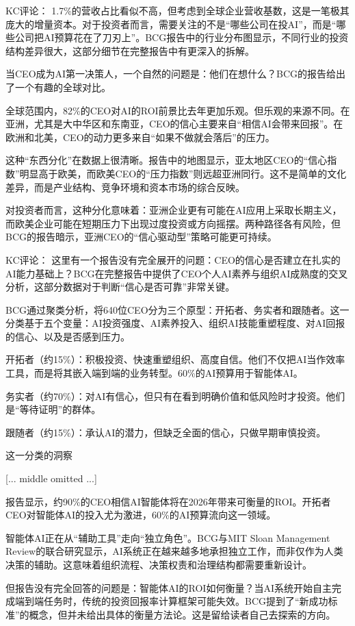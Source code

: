 \documentclass[11pt]{ctexart}
\begin{document}
KC评论： 1.7\%的营收占比看似不高，但考虑到全球企业营收基数，这是一笔极其庞大的增量资本。对于投资者而言，需要关注的不是“哪些公司在投AI”，而是“哪些公司把AI预算花在了刀刃上”。BCG报告中的行业分布图显示，不同行业的投资结构差异很大，这部分细节在完整报告中有更深入的拆解。

当CEO成为AI第一决策人，一个自然的问题是：他们在想什么？BCG的报告给出了一个有趣的全球对比。

全球范围内，82\%的CEO对AI的ROI前景比去年更加乐观。但乐观的来源不同。在亚洲，尤其是大中华区和东南亚，CEO的信心主要来自“相信AI会带来回报”。在欧洲和北美，CEO的动力更多来自“如果不做就会落后”的压力。

这种“东西分化”在数据上很清晰。报告中的地图显示，亚太地区CEO的“信心指数”明显高于欧美，而欧美CEO的“压力指数”则远超亚洲同行。这不是简单的文化差异，而是产业结构、竞争环境和资本市场的综合反映。

对投资者而言，这种分化意味着：亚洲企业更有可能在AI应用上采取长期主义，而欧美企业可能在短期压力下出现过度投资或方向摇摆。两种路径各有风险，但BCG的报告暗示，亚洲CEO的“信心驱动型”策略可能更可持续。

KC评论： 这里有一个报告没有完全展开的问题：CEO的信心是否建立在扎实的AI能力基础上？BCG在完整报告中提供了CEO个人AI素养与组织AI成熟度的交叉分析，这部分数据对于判断“信心是否可靠”非常关键。

BCG通过聚类分析，将640位CEO分为三个原型：开拓者、务实者和跟随者。这一分类基于五个变量：AI投资强度、AI素养投入、组织AI技能重塑程度、对AI回报的信心、以及是否感到压力。

开拓者（约15\%）：积极投资、快速重塑组织、高度自信。他们不仅把AI当作效率工具，而是将其嵌入端到端的业务转型。60\%的AI预算用于智能体AI。

务实者（约70\%）：对AI有信心，但只有在看到明确价值和低风险时才投资。他们是“等待证明”的群体。

跟随者（约15\%）：承认AI的潜力，但缺乏全面的信心，只做早期审慎投资。

这一分类的洞察

[... middle omitted ...]

报告显示，约90\%的CEO相信AI智能体将在2026年带来可衡量的ROI。开拓者CEO对智能体AI的投入尤为激进，60\%的AI预算流向这一领域。

智能体AI正在从“辅助工具”走向“独立角色”。BCG与MIT Sloan Management Review的联合研究显示，AI系统正在越来越多地承担独立工作，而非仅作为人类决策的辅助。这意味着组织流程、决策权责和治理结构都需要重新设计。

但报告没有完全回答的问题是：智能体AI的ROI如何衡量？当AI系统开始自主完成端到端任务时，传统的投资回报率计算框架可能失效。BCG提到了“新成功标准”的概念，但并未给出具体的衡量方法论。这是留给读者自己去探索的方向。
\end{document}
